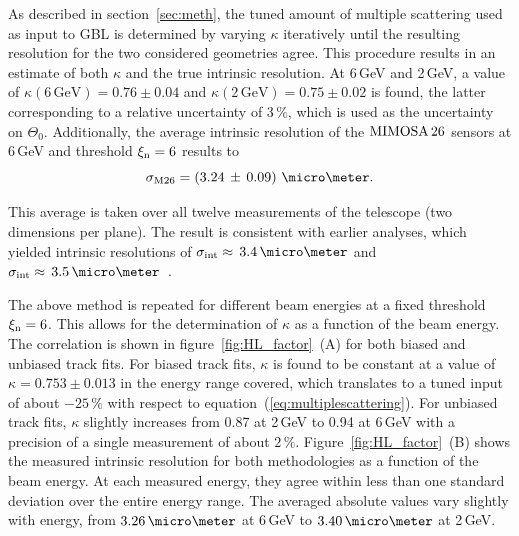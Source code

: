 As described in section~\ref{sec:meth}, the tuned amount of multiple scattering used as input to GBL
 is determined by varying $\kappa$ iteratively until the resulting resolution for the two considered geometries agree. 
This procedure results in an estimate of both $\kappa$ and the true intrinsic resolution. 
At 6\,GeV and 2\,GeV, a value of $\kappa(6\,\textrm{GeV}) = 0.76 \pm 0.04$ and $\kappa(2\,\textrm{GeV}) = 0.75 \pm 0.02$ is found, the latter corresponding to a relative uncertainty of $3\,\%$,
 which is used as the uncertainty on $\Theta_0$. 
Additionally, the average intrinsic resolution of the $\textrm{MIMOSA\,26}$ sensors at 6\,GeV and threshold $\xi_{\textrm{n}} = 6$ results to
\begin{equation}
 \sigma_{\textrm{M26}} = \left( 3.24\,\pm\, 0.09 \right)\,\micro\meter.  
\end{equation}

\noindent
This average is taken over all twelve measurements of the telescope (two dimensions per plane). 
The result is consistent with earlier analyses, which yielded intrinsic resolutions of $\sigmai \approx\,3.4\,\micro\meter$ \cite{ref:thomas} and $\sigmai \approx\,3.5\,\micro\meter$~\cite{ref:mimosa26}.

The above method is repeated for different beam energies at a fixed threshold $\xi_{\textrm{n}} = 6$. 
This allows for the determination of $\kappa$ as a function of the beam energy. 
The correlation is shown in figure~\ref{fig:HL_factor}~(A) for both biased and unbiased track fits. 
For biased track fits, $\kappa$ is found to be constant at a value of $\kappa = 0.753 \pm 0.013$ in the energy range covered,
 which translates to a tuned input of about $-25\,\%$ with respect to equation~(\ref{eq:multiplescattering}). 
For unbiased track fits, $\kappa$ slightly increases from 0.87 at 2\,GeV to 0.94 at 6\,GeV with a precision of a single measurement of about $2\,\%$.
Figure~\ref{fig:HL_factor}~(B) shows the measured intrinsic resolution for both methodologies as a function of the beam energy. 
At each measured energy, they agree within less than one standard deviation over the entire energy range. 
The averaged absolute values vary slightly with energy, from $3.26\,\micro\meter$ at 6\,GeV to $3.40\,\micro\meter$ at 2\,GeV. 

